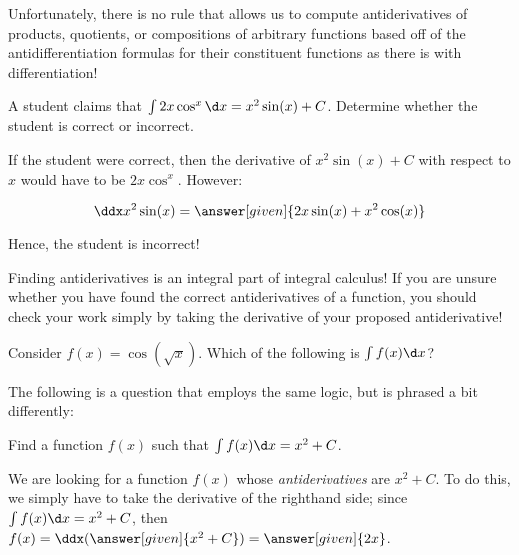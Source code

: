 \documentclass[nooutcomes]{ximera}
\begin{document}


Unfortunately, there is no rule that allows us to compute antiderivatives of products, quotients, or compositions of arbitrary functions based off of the antidifferentiation formulas for their constituent functions as there is with differentiation!  


\begin{example}
  A student claims that $\int 2x \cos^x \d x = x^2 \sin(x) +C$.  Determine whether the student is correct or incorrect.
  
  \begin{explanation}
    If the student were correct, then the derivative of $x^2 \sin(x) +C$ with respect to $x$ would have to be $2x \cos^x$.  However:
    
      \[\ddx x^2 \sin(x) = \answer[given]{2x \sin(x) +x^2 \cos(x)} \]
      
 Hence, the student is incorrect!
  \end{explanation}
\end{example}

\begin{remark}
Finding antiderivatives is an integral part of integral calculus!  If you are unsure whether you have found the correct antiderivatives of a function, you should check your work simply by taking the derivative of your proposed antiderivative!  
\end{remark}

\begin{question}
  Consider $f(x) = \cos(\sqrt{x})$. Which of the following is $\int f(x) \d x$?  
  \begin{selectAll}
  \end{selectAll}
\end{question}

The following is a question that employs the same logic, but is phrased a bit differently:

\begin{example}
  Find a function $f(x)$ such that $\int f(x) \d x = x^2 +C$.
  
  \begin{explanation}
    We are looking for a function $f(x)$ whose \emph{antiderivatives} are $x^2+C$.  To do this, we simply have to take the derivative of the righthand side; since $\int f(x) \d x =x^2+C$, then $f(x) = \ddx(\answer[given]{x^2+C}) =\answer[given]{2x}$.
    
    \end{explanation}
\end{example}
\end{document}
